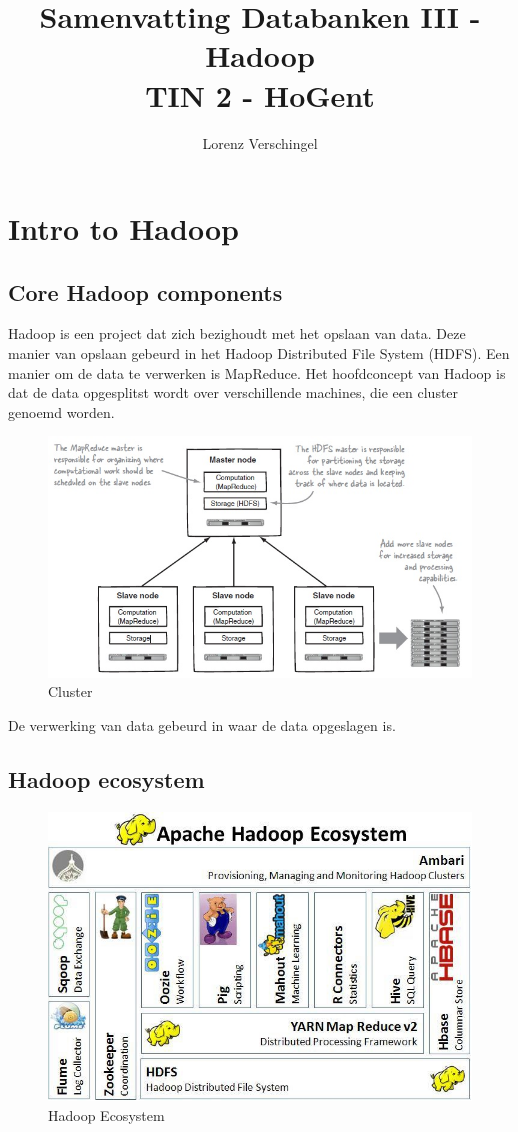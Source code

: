 \documentclass[a4paper,12pt]{article}
\title{Samenvatting Databanken III - Hadoop \\ \large TIN 2 - HoGent}
\author{Lorenz Verschingel}
\begin{document}
\maketitle
\section{Intro to Hadoop}
\subsection{Core Hadoop components}
Hadoop is een project dat zich bezighoudt met het opslaan van data.
Deze manier van opslaan gebeurd in het Hadoop Distributed File System (HDFS).
Een manier om de data te verwerken is MapReduce.
Het hoofdconcept van Hadoop is dat de data opgesplitst wordt over verschillende machines, die een cluster genoemd worden.

\begin{figure}[H]
\centering
\includegraphics[scale=0.75]{img/HadoopCluster.jpg}
\caption{Cluster}
\label{hadoop-cluster}
\end{figure}

De verwerking van data gebeurd in waar de data opgeslagen is.

\subsection{Hadoop ecosystem}

\begin{figure}[H]
\centering
\includegraphics[scale=0.75]{img/HadoopEcosystem.jpg}
\caption{Hadoop Ecosystem}
\label{hadoop-ecosystem}
\end{figure}
\end{document}
